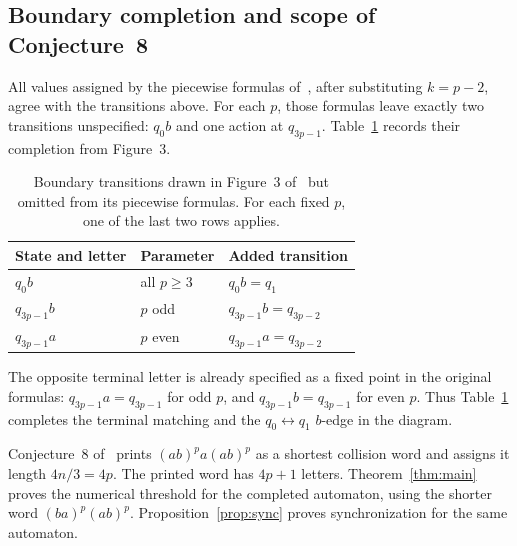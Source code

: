 \documentclass[11pt]{article}
\begin{document}
\subsection*{Boundary completion and scope of Conjecture~8}
All values assigned by the piecewise formulas of~\cite{szykula}, after substituting $k=p-2$, agree with the transitions above. For each $p$, those formulas leave exactly two transitions unspecified: $q_0b$ and one action at $q_{3p-1}$. Table~\ref{tab:boundary} records their completion from Figure~3.

\begin{table}[ht]
\centering\small
\begin{tabular}{@{}lll@{}}\toprule
State and letter & Parameter & Added transition\\\midrule
$q_0b$ & all $p\geq3$ & $q_0b=q_1$\\
$q_{3p-1}b$ & $p$ odd & $q_{3p-1}b=q_{3p-2}$\\
$q_{3p-1}a$ & $p$ even & $q_{3p-1}a=q_{3p-2}$\\\bottomrule
\end{tabular}
\caption{Boundary transitions drawn in Figure~3 of~\cite{szykula} but omitted from its piecewise formulas. For each fixed $p$, one of the last two rows applies.}
\label{tab:boundary}
\end{table}

The opposite terminal letter is already specified as a fixed point in the original formulas: $q_{3p-1}a=q_{3p-1}$ for odd $p$, and $q_{3p-1}b=q_{3p-1}$ for even $p$. Thus Table~\ref{tab:boundary} completes the terminal matching and the $q_0\leftrightarrow q_1$ $b$-edge in the diagram.

Conjecture~8 of~\cite{szykula} prints $(ab)^p a(ab)^p$ as a shortest collision word and assigns it length $4n/3=4p$. The printed word has $4p+1$ letters. Theorem~\ref{thm:main} proves the numerical threshold for the completed automaton, using the shorter word $(ba)^p(ab)^p$. Proposition~\ref{prop:sync} proves synchronization for the same automaton.
\end{document}
